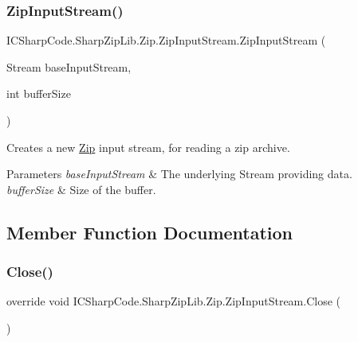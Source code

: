 \subsubsection{\texorpdfstring{Zip\+Input\+Stream()}{ZipInputStream()}\hspace{0.1cm}{\footnotesize\ttfamily [2/2]}}
{\footnotesize\ttfamily I\+C\+Sharp\+Code.\+Sharp\+Zip\+Lib.\+Zip.\+Zip\+Input\+Stream.\+Zip\+Input\+Stream (\begin{DoxyParamCaption}\item[{Stream}]{base\+Input\+Stream,  }\item[{int}]{buffer\+Size }\end{DoxyParamCaption})\hspace{0.3cm}{\ttfamily [inline]}}



Creates a new \hyperlink{namespace_i_c_sharp_code_1_1_sharp_zip_lib_1_1_zip}{Zip} input stream, for reading a zip archive. 


\begin{DoxyParams}{Parameters}
{\em base\+Input\+Stream} & The underlying Stream providing data.\\
\hline
{\em buffer\+Size} & Size of the buffer.\\
\hline
\end{DoxyParams}


\subsection{Member Function Documentation}
\mbox{\label{class_i_c_sharp_code_1_1_sharp_zip_lib_1_1_zip_1_1_zip_input_stream_a726748563aeb79d22f65546352bec318}} 
\subsubsection{\texorpdfstring{Close()}{Close()}}
{\footnotesize\ttfamily override void I\+C\+Sharp\+Code.\+Sharp\+Zip\+Lib.\+Zip.\+Zip\+Input\+Stream.\+Close (\begin{DoxyParamCaption}{ }\end{DoxyParamCaption})\hspace{0.3cm}{\ttfamily [inline]}}



